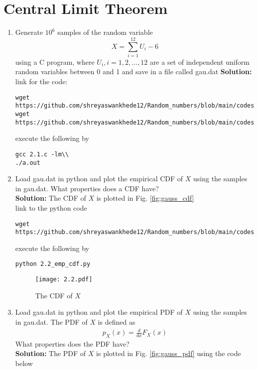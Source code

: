 \documentclass[journal,12pt,twocolumn]{IEEEtran}
\renewcommand\thesection{\arabic{section}}
\theoremstyle{remark}
\newcommand{\solution}{\noindent \textbf{Solution: }}
\numberwithin{equation}{section}
\begin{document}
\section{Central Limit Theorem}
%
\begin{enumerate}[label=\thesection.\arabic*
,ref=\thesection.\theenumi]
%
\item
Generate $10^6$ samples of the random variable
%
\begin{equation}
X = \sum_{i=1}^{12}U_i -6
\end{equation}
%
using a C program, where $U_i, i = 1,2,\dots, 12$ are  a set of independent uniform random variables between 0 and 1
and save in a file called gau.dat
\solution link for the code:
\begin{lstlisting}
wget https://github.com/shreyaswankhede12/Random_numbers/blob/main/codes/2.1.c\\
wget https://github.com/shreyaswankhede12/Random_numbers/blob/main/codes/coeffs.h
\end{lstlisting}
execute the following by
\begin{lstlisting}
gcc 2.1.c -lm\\
./a.out
\end{lstlisting}
\item
Load gau.dat in python and plot the empirical CDF of $X$ using the samples in gau.dat. What properties does a CDF have?
\\
\solution The CDF of $X$ is plotted in Fig. \ref{fig:gauss_cdf}\\
link to the python code
\begin{lstlisting}
wget https://github.com/shreyaswankhede12/Random_numbers/blob/main/codes/2.2_emp_cdf.py
\end{lstlisting}
execute the following by
\begin{lstlisting}
python 2.2_emp_cdf.py
\end{lstlisting}
\begin{figure}
\centering
\texttt{[image: 2.2.pdf]}
\caption{The CDF of $X$}
\label{fig:2.2}
\end{figure}
\item
Load gau.dat in python and plot the empirical PDF of $X$ using the samples in gau.dat. The PDF of $X$ is defined as
\begin{align}
p_{X}(x) = \frac{d}{dx}F_{X}(x)
\end{align}
What properties does the PDF have?
\\
\solution The PDF of $X$ is plotted in Fig. \ref{fig:gauss_pdf} using the code below

\end{enumerate}
\end{document}
